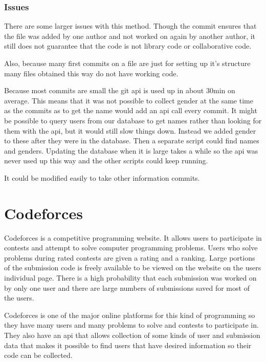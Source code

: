 \documentclass{article}
\begin{document}
\subsubsection{Issues}
There are some larger issues with this method. Though the commit ensures that the file was added by one author and not worked on again by another author, it still does not guarantee that the code is not library code or collaborative code.

Also, because many first commits on a file are just for setting up it's structure many files obtained this way do not have working code.

Because most commits are small the git api is used up in about 30min on average. This means that it was not possible to collect gender at the same time as the commits as to get the name would add an api call every commit. It might be possible to query users from our database to get names rather than looking for them with the api, but it would still slow things down. Instead we added gender to these after they were in the database. Then a separate script could find names and genders. Updating the database when it is large takes a while so the api was never used up this way and the other scripts could keep running.

It could be modified easily to take other information commits.

\section{Codeforces}
Codeforces is a competitive programming website. It allows users to participate in contests and attempt to solve computer programming problems. Users who solve problems during rated contests are given a rating and a ranking. Large portions of the submission code is freely available to be viewed on the website on the users individual page. There is a high probability that each submission was worked on by only one user and there are large numbers of submissions saved for most of the users.

Codeforces is one of the major online platforms for this kind of programming so they have many users and many problems to solve and contests to participate in. They also have an api that allows collection of some kinds of user and submission data that makes it possible to find users that have desired information so their code can be collected.
\end{document}
